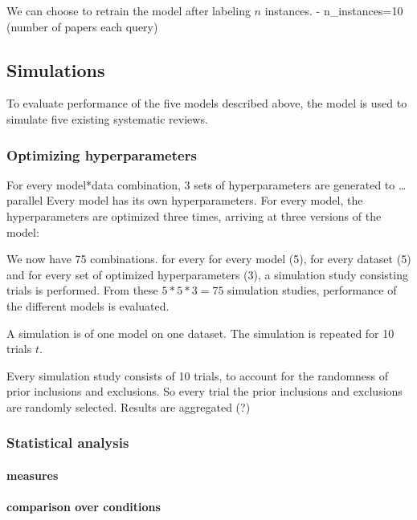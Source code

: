 \documentclass[
]{article}
\begin{document}
We can choose to retrain the model after labeling \(n\) instances. -
n\_instances=10 (number of papers each query)

\hypertarget{simulations}{%
\subsection{Simulations}\label{simulations}}

To evaluate performance of the five models described above, the model is
used to simulate five existing systematic reviews.

\hypertarget{optimizing-hyperparameters}{%
\subsubsection{Optimizing
hyperparameters}\label{optimizing-hyperparameters}}

For every model*data combination, 3 sets of hyperparameters are
generated to \ldots{} parallel Every model has its own hyperparameters.
For every model, the hyperparameters are optimized three times, arriving
at three versions of the model:

We now have 75 combinations. for every for every model (5), for every
dataset (5) and for every set of optimized hyperparameters (3), a
simulation study consisting trials is performed. From these \(5*5*3=75\)
simulation studies, performance of the different models is evaluated.

A simulation is of one model on one dataset. The simulation is repeated
for 10 trials \(t\).

Every simulation study consists of 10 trials, to account for the
randomness of prior inclusions and exclusions. So every trial the prior
inclusions and exclusions are randomly selected. Results are aggregated
(?)

\hypertarget{statistical-analysis}{%
\subsubsection{Statistical analysis}\label{statistical-analysis}}

\hypertarget{measures}{%
\paragraph{measures}\label{measures}}

\hypertarget{comparison-over-conditions}{%
\paragraph{comparison over
conditions}\label{comparison-over-conditions}}
\end{document}
